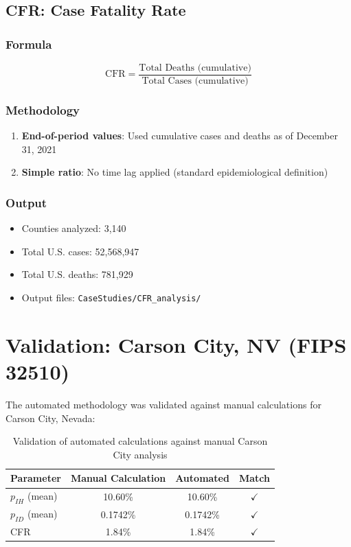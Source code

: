 \documentclass[11pt]{article}
\begin{document}
\subsection{CFR: Case Fatality Rate}

\subsubsection{Formula}
\begin{equation}
    \text{CFR} = \frac{\text{Total Deaths (cumulative)}}{\text{Total Cases (cumulative)}}
\end{equation}

\subsubsection{Methodology}
\begin{enumerate}
    \item \textbf{End-of-period values}: Used cumulative cases and deaths as of December 31, 2021
    \item \textbf{Simple ratio}: No time lag applied (standard epidemiological definition)
\end{enumerate}

\subsubsection{Output}
\begin{itemize}
    \item Counties analyzed: 3,140
    \item Total U.S. cases: 52,568,947
    \item Total U.S. deaths: 781,929
    \item Output files: \texttt{CaseStudies/CFR\_analysis/}
\end{itemize}

\section{Validation: Carson City, NV (FIPS 32510)}

The automated methodology was validated against manual calculations for Carson City, Nevada:

\begin{table}[h]
\centering
\begin{tabular}{lccc}
\toprule
\textbf{Parameter} & \textbf{Manual Calculation} & \textbf{Automated} & \textbf{Match} \\
\midrule
$p_{IH}$ (mean) & 10.60\% & 10.60\% & $\checkmark$ \\
$p_{ID}$ (mean) & 0.1742\% & 0.1742\% & $\checkmark$ \\
CFR & 1.84\% & 1.84\% & $\checkmark$ \\
\bottomrule
\end{tabular}
\caption{Validation of automated calculations against manual Carson City analysis}
\end{table}
\end{document}
